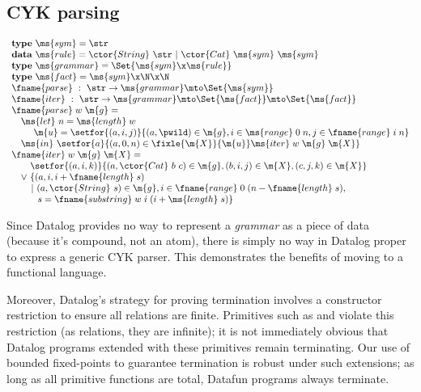 \documentclass[preprint]{sigplanconf}
\newcommand{\uto}{\to}
\begin{document}
\subsection{CYK parsing}

\[\begin{array}{l}
\mathbf{type}~\ms{sym} = \str\\
\mathbf{data}~\ms{rule} = \ctor{String}~\str ~|~ \ctor{Cat}~\ms{sym}~\ms{sym}\\
\mathbf{type}~\ms{grammar} = \Set{\ms{sym} \x \ms{rule}}\\
\mathbf{type}~\ms{fact} = \ms{sym} \x \N \x \N\\
\fname{parse} ~:~ \str \uto \ms{grammar} \mto \Set{\ms{sym}}\\
\fname{iter} ~:~ \str \uto \ms{grammar} \mto \Set{\ms{fact}}
\mto \Set{\ms{fact}}\\
\fname{parse}\;w\;\m{g} =\\
\hspace{1em} \ms{let}~ n = \ms{length}\;w\\
\hspace{2.375em}\m{u} =
  \setfor{(a,i,j)}{(a,\pwild) \in \m{g}, i \in \ms{range}\;0\;n,
  j\in\fname{range}\;i\;n}\\
\hspace{1em}\ms{in}~\setfor{a}{(a, 0, n) \in %
  \fixle{\m{X}}{\m{u}} \ms{iter}\;w\;\m{g}\;\m{X}}\\
\fname{iter}\;w\;\m{g}\;\m{X} =\\
\hspace{1em}\phantom{\vee~}\setfor{(a,i,k)}{(a, \ctor{Cat}~b~c) \in \m{g},
  (b,i,j) \in \m{X}, (c,j,k) \in \m{X}}\\
\hspace{1em}\vee~ \{(a,i,i+\fname{length}\;s)\\
\hspace{2.1em}|~ (a, \ctor{String}~s) \in \m{g},
i \in \fname{range}\;0\;(n-\fname{length}\;s),\\
\hspace{2.2em}\phantom{|~} s = \fname{substring}\;w\;i\;(i+\ms{length}\;s)\}
\end{array}\]

\TODO Since Datalog provides no way to represent a \emph{grammar} as a piece of
data (because it's compound, not an atom), there is simply no way in Datalog
proper to express a generic CYK parser. This demonstrates the benefits of moving
to a functional language.

\TODO Moreover, Datalog's strategy for proving termination involves a
constructor restriction to ensure all relations are finite. Primitives such as
 and  violate this restriction (as relations, they are
infinite); it is not immediately obvious that Datalog programs extended with
these primitives remain terminating. Our use of bounded fixed-points to
guarantee termination is robust under such extensions; as long as all primitive
functions are total, Datafun programs always terminate.
\end{document}
